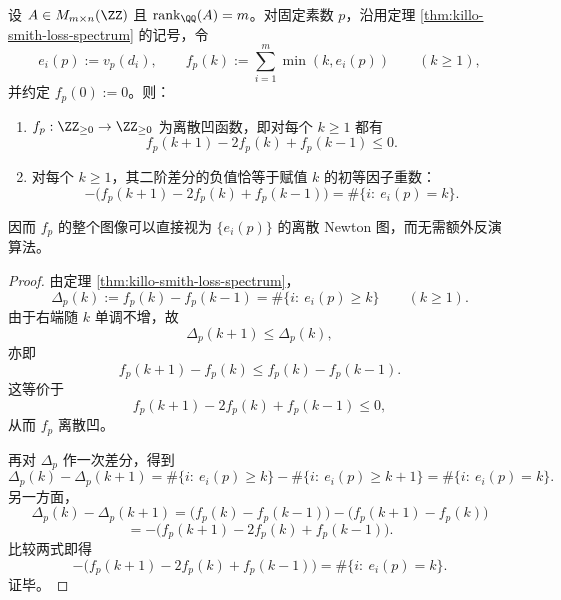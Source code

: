 \begin{theorem}\label{thm:xi-smith-loss-discrete-curvature-atoms}
设 \(A\in M_{m\times n}(\ZZ)\) 且 \(\operatorname{rank}_{\QQ}(A)=m\)。对固定素数 \(p\)，沿用定理
\ref{thm:killo-smith-loss-spectrum} 的记号，令
\[
e_i(p):=v_p(d_i),
\qquad
f_p(k):=\sum_{i=1}^{m}\min(k,e_i(p))
\qquad(k\ge 1),
\]
并约定 \(f_p(0):=0\)。则：
\begin{enumerate}
\item \(f_p:\ZZ_{\ge 0}\to\ZZ_{\ge 0}\) 为离散凹函数，即对每个 \(k\ge 1\) 都有
\[
f_p(k+1)-2f_p(k)+f_p(k-1)\le 0.
\]
\item 对每个 \(k\ge 1\)，其二阶差分的负值恰等于赋值 \(k\) 的初等因子重数：
\[
-\bigl(f_p(k+1)-2f_p(k)+f_p(k-1)\bigr)
=
\#\{i:\ e_i(p)=k\}.
\]
\end{enumerate}
因而 \(f_p\) 的整个图像可以直接视为 \(\{e_i(p)\}\) 的离散 Newton 图，而无需额外反演算法。
\end{theorem}
\begin{proof}
由定理 \ref{thm:killo-smith-loss-spectrum}，
\[
\Delta_p(k):=f_p(k)-f_p(k-1)=\#\{i:\ e_i(p)\ge k\}
\qquad(k\ge 1).
\]
由于右端随 \(k\) 单调不增，故
\[
\Delta_p(k+1)\le \Delta_p(k),
\]
亦即
\[
f_p(k+1)-f_p(k)\le f_p(k)-f_p(k-1).
\]
这等价于
\[
f_p(k+1)-2f_p(k)+f_p(k-1)\le 0,
\]
从而 \(f_p\) 离散凹。

再对 \(\Delta_p\) 作一次差分，得到
\[
\Delta_p(k)-\Delta_p(k+1)
=
\#\{i:\ e_i(p)\ge k\}-\#\{i:\ e_i(p)\ge k+1\}
=
\#\{i:\ e_i(p)=k\}.
\]
另一方面，
\[
\Delta_p(k)-\Delta_p(k+1)
=
\bigl(f_p(k)-f_p(k-1)\bigr)-\bigl(f_p(k+1)-f_p(k)\bigr)
\]
\[
=
-\bigl(f_p(k+1)-2f_p(k)+f_p(k-1)\bigr).
\]
比较两式即得
\[
-\bigl(f_p(k+1)-2f_p(k)+f_p(k-1)\bigr)
=
\#\{i:\ e_i(p)=k\}.
\]
证毕。
\end{proof}

